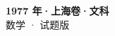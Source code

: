 \documentclass[zihao=-4, a4paper]{ctexart}
\begin{document}
\begin{center}
  {\Large\bfseries 1977 年·上海卷·文科}\\[4pt]
  {\large 数学 · 试题版}
\end{center}
\medskip
{}

\end{document}
